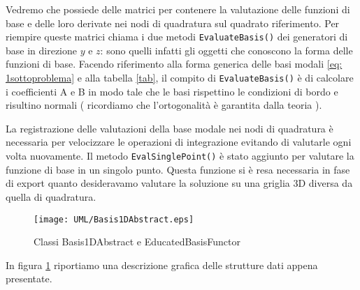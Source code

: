 Vedremo che  possiede delle matrici per contenere la valutazione delle funzioni di base e delle loro derivate
nei nodi di quadratura sul quadrato riferimento.
Per riempire queste matrici  chiama i due metodi \texttt{EvaluateBasis()} dei generatori di base in direzione $y$ e $z$:
sono quelli infatti gli oggetti che conoscono la forma delle funzioni di base. 
Facendo riferimento alla forma generica delle basi modali \eqref{eq: 1sottoproblema} e alla tabella \ref{tab}, il compito di \texttt{EvaluateBasis()}
\`e di calcolare i coefficienti A e B in modo tale che le basi rispettino le condizioni di bordo e risultino normali ( ricordiamo che 
l'ortogonalit\`a \`e garantita dalla teoria ).

La registrazione delle valutazioni della base modale nei nodi di quadratura \`e necessaria per velocizzare le operazioni di 
integrazione evitando di valutarle ogni volta nuovamente.
Il metodo \texttt{EvalSinglePoint()} \`e stato aggiunto per valutare la funzione di base in un singolo punto.
Questa funzione si \`e resa necessaria in fase di export quanto desideravamo 
valutare la soluzione su una griglia 3D diversa da quella di quadratura.
\begin{figure}[!htbp]
        \centering%
        {\texttt{[image: UML/Basis1DAbstract.eps]}}\qquad
        \caption{Classi Basis1DAbstract e EducatedBasisFunctor}
        \label{fig: UMLBasis}
\end{figure}
In figura \ref{fig: UMLBasis} riportiamo una descrizione grafica delle strutture dati appena presentate.

